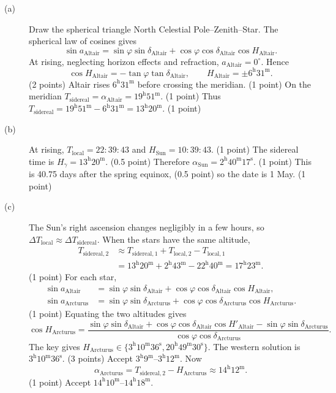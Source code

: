 \begin{description}
\item[(a)] Draw the spherical triangle North Celestial Pole--Zenith--Star.
The spherical law of cosines gives
\[
\sin a_{\mathrm{Altair}}=\sin\varphi\sin\delta_{\mathrm{Altair}}+\cos\varphi\cos\delta_{\mathrm{Altair}}\cos H_{\mathrm{Altair}}.
\]
At rising, neglecting horizon effects and refraction, $a_{\mathrm{Altair}}=0^\circ$. Hence
\[
\cos H_{\mathrm{Altair}}=-\tan\varphi\tan\delta_{\mathrm{Altair}},\qquad
H_{\mathrm{Altair}}=\pm6^{\mathrm h}31^{\mathrm m}.
\]\hfill(2 points)
Altair rises $6^{\mathrm h}31^{\mathrm m}$ before crossing the meridian. \hfill(1 point)
On the meridian $T_{\mathrm{sidereal}}=\alpha_{\mathrm{Altair}}=19^{\mathrm h}51^{\mathrm m}$. \hfill(1 point)
Thus $T_{\mathrm{sidereal}}=19^{\mathrm h}51^{\mathrm m}-6^{\mathrm h}31^{\mathrm m}=13^{\mathrm h}20^{\mathrm m}$. \hfill(1 point)
\item[(b)] At rising, $T_{\mathrm{local}}=22{:}39{:}43$ and $H_{\mathrm{Sun}}=10{:}39{:}43$. \hfill(1 point)
The sidereal time is $H_\gamma=13^{\mathrm h}20^{\mathrm m}$. \hfill(0.5 point)
Therefore $\alpha_{\mathrm{Sun}}=2^{\mathrm h}40^{\mathrm m}17^{\mathrm s}$. \hfill(1 point)
This is 40.75 days after the spring equinox, \hfill(0.5 point)
so the date is 1 May. \hfill(1 point)
\item[(c)] The Sun's right ascension changes negligibly in a few hours, so $\Delta T_{\mathrm{local}}\approx\Delta T_{\mathrm{sidereal}}$. When the stars have the same altitude,
\begin{align*}
T_{\mathrm{sidereal},2}&\approx T_{\mathrm{sidereal},1}+T_{\mathrm{local},2}-T_{\mathrm{local},1}\\
&=13^{\mathrm h}20^{\mathrm m}+2^{\mathrm h}43^{\mathrm m}-22^{\mathrm h}40^{\mathrm m}=17^{\mathrm h}23^{\mathrm m}.
\end{align*}\hfill(1 point)
For each star,
\begin{align*}
\sin a_{\mathrm{Altair}}&=\sin\varphi\sin\delta_{\mathrm{Altair}}+\cos\varphi\cos\delta_{\mathrm{Altair}}\cos H_{\mathrm{Altair}},\\
\sin a_{\mathrm{Arcturus}}&=\sin\varphi\sin\delta_{\mathrm{Arcturus}}+\cos\varphi\cos\delta_{\mathrm{Arcturus}}\cos H_{\mathrm{Arcturus}}.
\end{align*}\hfill(1 point)
Equating the two altitudes gives
\[
\cos H_{\mathrm{Arcturus}}=
\frac{\sin\varphi\sin\delta_{\mathrm{Altair}}+\cos\varphi\cos\delta_{\mathrm{Altair}}\cos H'_{\mathrm{Altair}}-\sin\varphi\sin\delta_{\mathrm{Arcturus}}}{\cos\varphi\cos\delta_{\mathrm{Arcturus}}}.
\]
The key gives $H_{\mathrm{Arcturus}}\in\{3^{\mathrm h}10^{\mathrm m}36^{\mathrm s},20^{\mathrm h}49^{\mathrm m}30^{\mathrm s}\}$. The western solution is $3^{\mathrm h}10^{\mathrm m}36^{\mathrm s}$. \hfill(3 points)
Accept $3^{\mathrm h}9^{\mathrm m}$--$3^{\mathrm h}12^{\mathrm m}$. Now
\[
\alpha_{\mathrm{Arcturus}}=T_{\mathrm{sidereal},2}-H_{\mathrm{Arcturus}}\approx14^{\mathrm h}12^{\mathrm m}.
\]\hfill(1 point)
Accept $14^{\mathrm h}10^{\mathrm m}$--$14^{\mathrm h}18^{\mathrm m}$.
\end{description}
